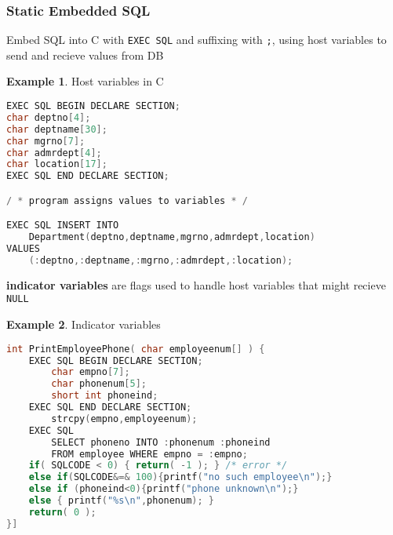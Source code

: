 \documentclass[]{article}
\theoremstyle{definition}
\newtheorem{ex}{Example}[section]
\begin{document}
			\subsubsection{Static Embedded SQL}		
				Embed SQL into C with \lstinline|EXEC SQL| and suffixing with \lstinline|;|, using host variables to send and recieve values from DB
				\begin{ex}
					Host variables in C
					\begin{lstlisting}[language=C]
EXEC SQL BEGIN DECLARE SECTION;
char deptno[4];
char deptname[30];
char mgrno[7];
char admrdept[4];
char location[17];
EXEC SQL END DECLARE SECTION;

/ * program assigns values to variables * /

EXEC SQL INSERT INTO
	Department(deptno,deptname,mgrno,admrdept,location)
VALUES
	(:deptno,:deptname,:mgrno,:admrdept,:location);
					\end{lstlisting}
				\end{ex}
				\textbf{indicator variables} are flags used to handle host variables that might recieve \lstinline|NULL|
				\begin{ex}
					Indicator variables
					\begin{lstlisting}[language=C]
int PrintEmployeePhone( char employeenum[] ) {
	EXEC SQL BEGIN DECLARE SECTION;
		char empno[7];
		char phonenum[5];
		short int phoneind;
	EXEC SQL END DECLARE SECTION;
		strcpy(empno,employeenum);
	EXEC SQL
		SELECT phoneno INTO :phonenum :phoneind
		FROM employee WHERE empno = :empno;
	if( SQLCODE < 0) { return( -1 ); } /* error */
	else if(SQLCODE&=& 100){printf("no such employee\n");}
	else if (phoneind<0){printf("phone unknown\n");}
	else { printf("%s\n",phonenum); } 
	return( 0 );
}]
					\end{lstlisting}
				\end{ex}
\end{document}
